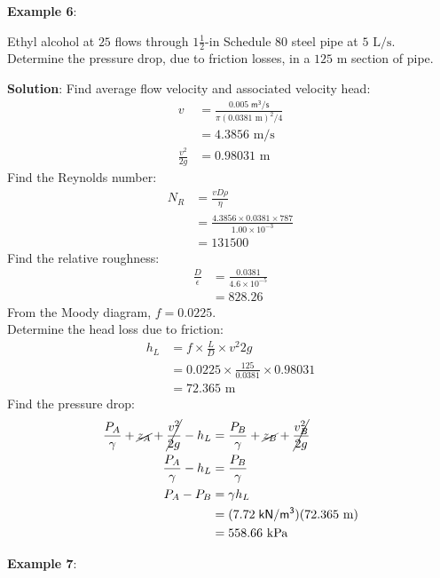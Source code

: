 \documentclass[10pt]{amsart}
\begin{document}
	
	\newpage

	
	\textbf{Example 6}:
	
	Ethyl alcohol at $25$\textcelsius{} flows through $1\tfrac{1}{2}\text{-in}$ Schedule $80$ steel pipe at
	$5\text{ L/s}$. Determine the pressure drop, due to friction losses, in a $125\text{ m}$ section of pipe.

	\textbf{Solution}:
	Find average flow velocity and associated velocity head:
	\begin{align*}
		v &= \frac{0.005\;\mathsf{m^3/s}}{\pi(0.0381\text{ m})^2/4}\\
		&= 4.3856\text{ m/s}\\
		\frac{v^2}{2g} &= 0.98031\text{ m}
	\end{align*}
	Find the Reynolds number:
	\begin{align*}
		N_R &= \frac{vD\rho}{\eta}\\
		&= \frac{4.3856\times 0.0381\times 787}{1.00\times10^{-3}}\\
		&= 131500
	\end{align*}
	Find the relative roughness:
	\begin{align*}
		\frac{D}{\epsilon} &= \frac{0.0381}{4.6\times10^{-5}}\\
		&= 828.26
	\end{align*}
	From the Moody diagram, $f=0.0225$.\\
	Determine the head loss due to friction:
	\begin{align*}
		h_L &= f\times\frac{L}{D}\times{v^2}{2g}\\
		&= 0.0225\times\frac{125}{0.0381}\times0.98031\\
		&= 72.365\text{ m}
	\end{align*}
	Find the pressure drop:
	\begin{align*}
		\frac{P_A}{\gamma}+ \cancel{z_A} + \cancel{\frac{v^2}{2g}}-h_L &= \frac{P_B}{\gamma}+\cancel{z_B}+\cancel{\frac{v_B^2}{2g}}\\ 
		\frac{P_A}{\gamma}-h_L &= \frac{P_B}{\gamma}\\ 
		P_A-P_B &= \gamma h_L\\
		&= (7.72\;\mathsf{kN/m^3})(72.365\text{ m})	\\
		&= 558.66\text{ kPa}	
	\end{align*}
	
	\vfill\newpage
	\textbf{Example 7}:
	
\end{document}
